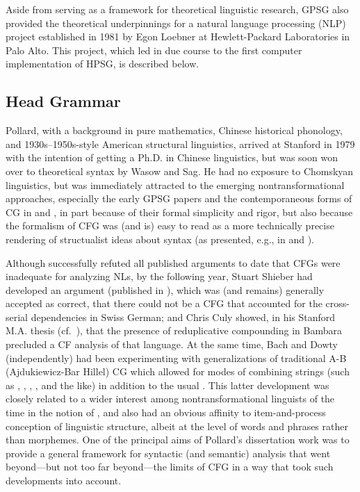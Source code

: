 \documentclass[output=paper
                ,modfonts
                ,nonflat
	        ,collection
	        ,collectionchapter
	        ,collectiontoclongg
 	        ,biblatex
                ,babelshorthands
                ,newtxmath
                ,draftmode
                ,colorlinks, citecolor=brown
]{./langsci/langscibook}
\begin{document}
Aside from serving as a framework for theoretical linguistic research, GPSG also provided the theoretical underpinnings for a natural language processing (NLP) project established in 1981 by Egon Loebner at Hewlett-Packard Laboratories in Palo Alto. This project, which led in due course to the first computer implementation of HPSG, is described below.

\subsection{Head Grammar}

Pollard, with a background in pure mathematics, Chinese historical phonology, and 1930s--1950s-style American structural linguistics, arrived at Stanford in 1979 with the intention of getting a Ph.D. in Chinese linguistics, but was soon won over to theoretical syntax by Wasow and Sag. He had no exposure to Chomskyan linguistics, but was immediately attracted to the emerging nontransformational approaches, especially the early GPSG papers and the contemporaneous forms of CG in \citet{Bach79a,Bach80a} and \citet{Dowty82a-u,Dowty82b}, in part because of their formal simplicity and rigor, but also because the formalism of CFG was (and is) easy to read as a more technically precise rendering of structualist ideas about syntax (as presented, e.g., in \citealt{Bloomfield33a-u} and \citealt{Hockett1958}).

Although \citet{PG82a-u} successfully refuted all published arguments to date that CFGs were inadequate for analyzing NLs, by the following year, Stuart Shieber had developed an argument (published in \citealt{Shieber85a}), which was (and remains) generally accepted as correct, that there could not be a CFG that accounted for the cross-serial dependencies in Swiss German; and Chris Culy showed, in his Stanford M.A. thesis (cf.\ \citealt{Culy85a}), that the presence of reduplicative compounding in Bambara precluded a CF analysis of that language. At the same time, Bach and Dowty (independently) had been experimenting with generalizations of traditional A-B (Ajdukiewicz-Bar Hillel) CG which allowed for modes of combining strings (such as , , , , and the like) in addition to the usual . This latter development was closely related to a wider interest among nontransformational linguists of the time in the notion of , and also had an obvious affinity to  item-and-process conception of linguistic structure, albeit at the level of words and phrases rather than morphemes. One of the principal aims of Pollard's dissertation work was to provide a general framework for syntactic (and semantic) analysis that went beyond---but not too far beyond---the limits of CFG in a way that took such developments into account. 
\end{document}
